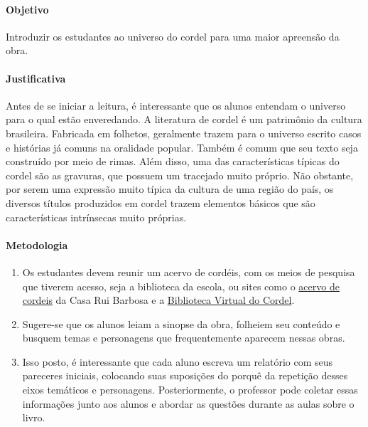 \documentclass[12pt]{extarticle}
\begin{document}
\paragraph{Objetivo} Introduzir os estudantes ao universo do cordel para uma maior apreensão da obra.

\paragraph{Justificativa} Antes de se iniciar a leitura, é interessante que os alunos
entendam o universo para o qual estão enveredando. A literatura de
cordel é um patrimônio da cultura brasileira. Fabricada em folhetos,
geralmente trazem para o universo escrito casos e histórias já comuns na
oralidade popular. Também é comum que seu texto seja construído por meio
de rimas. Além disso, uma das características típicas do cordel são as
gravuras, que possuem um tracejado muito próprio. Não obstante, por
serem uma expressão muito típica da cultura de uma região do país, os
diversos títulos produzidos em cordel trazem elementos básicos que são
características intrínsecas muito próprias.

\paragraph{Metodologia}

\begin{enumerate}

\item Os estudantes devem reunir um acervo de cordéis, com os meios de pesquisa que tiverem acesso, seja a biblioteca da escola, ou sites como o \href{http://www.casaruibarbosa.gov.br/cordel/acervo.html}{acervo de cordeis} da Casa Rui Barbosa e a \href{http://cordel.edel.univ-poitiers.fr}{Biblioteca Virtual do Cordel}.

\item Sugere-se que os alunos leiam a
sinopse da obra, folheiem seu conteúdo e busquem temas e personagens que
frequentemente aparecem nessas obras. 

\item Isso posto, é interessante que
cada aluno escreva um relatório com seus pareceres iniciais, colocando
suas suposições do porquê da repetição desses eixos temáticos e
personagens. Posteriormente, o professor pode coletar essas informações
junto aos alunos e abordar as questões durante as aulas sobre o livro.

\end{enumerate}
\end{document}
